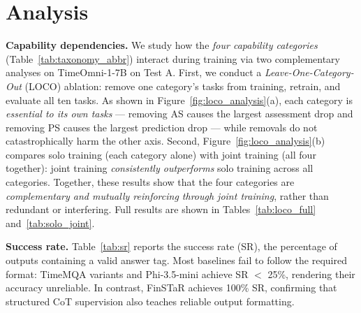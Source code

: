 \section{Analysis}
\label{sec:analysis}

\setlength{\columnsep}{1pt} 
\begin{table}
\vspace{-14pt}
\centering
\caption{Taxonomy of tasks.}
\label{tab:taxonomy_abbr}
\footnotesize
{}
\vspace{-10pt}
\end{table}
\textbf{Capability dependencies.}
We study how the \textit{four capability categories} (Table~\ref{tab:taxonomy_abbr}) interact during training via two complementary analyses on TimeOmni-1-7B on Test A.
First, we conduct a \textit{Leave-One-Category-Out} (LOCO) ablation: remove one category's tasks from training, retrain, and evaluate all ten tasks.
As shown in Figure~\ref{fig:loco_analysis}(a), each category is \textit{essential to its own tasks} --- removing AS causes the largest assessment drop and removing PS causes the largest prediction drop --- while removals do not catastrophically harm the other axis.
Second, Figure~\ref{fig:loco_analysis}(b) compares solo training (each category alone) with joint training (all four together): joint training \textit{consistently outperforms} solo training across all categories.
Together, these results show that the four categories are \textit{complementary and mutually reinforcing through joint training}, rather than redundant or interfering.
Full results are shown in Tables~\ref{tab:loco_full} and~\ref{tab:solo_joint}.


\textbf{Success rate.}
Table~\ref{tab:sr} reports the success rate (SR), the percentage of outputs containing a valid answer tag.
Most baselines fail to follow the required format: TimeMQA variants and Phi-3.5-mini achieve SR $<$ 25\%, rendering their accuracy unreliable.
In contrast, FinSTaR achieves 100\% SR, confirming that structured CoT supervision also teaches reliable output formatting.

